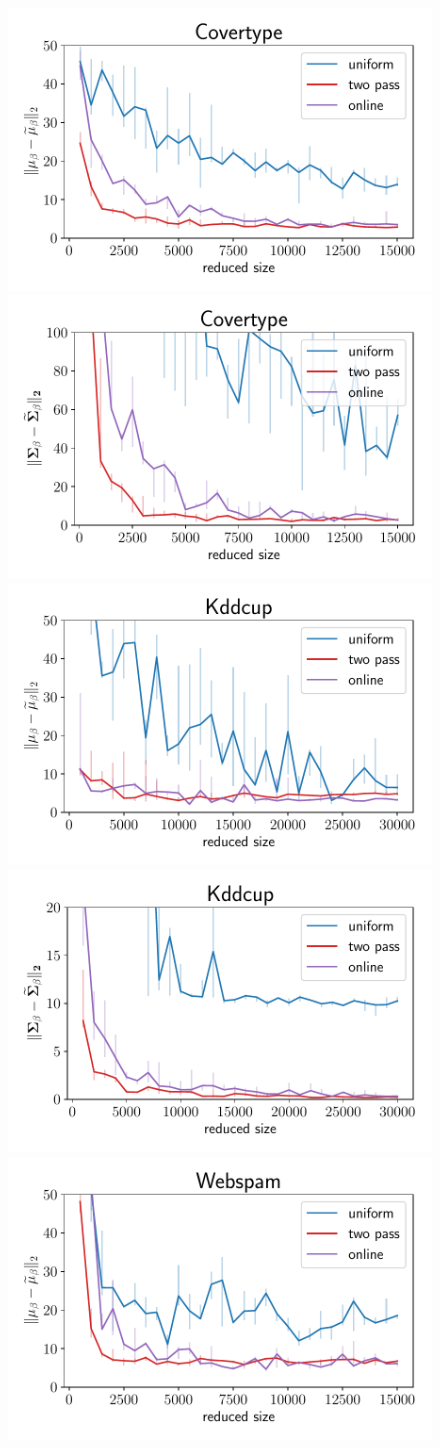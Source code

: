 \begin{figure}[ht!]
    \centering
    \includegraphics[width=.49\linewidth]{figures/covertype_bayes_plot_norm.pdf}
    \includegraphics[width=.49\linewidth]{figures/covertype_bayes_plot_matrix_norm.pdf}
    \includegraphics[width=.49\linewidth]{figures/kddcup_bayes_plot_norm.pdf}
    \includegraphics[width=.49\linewidth]{figures/kddcup_bayes_plot_matrix_norm.pdf}
    \includegraphics[width=.49\linewidth]{figures/webspam_bayes_plot_norm.pdf}

\end{figure}
